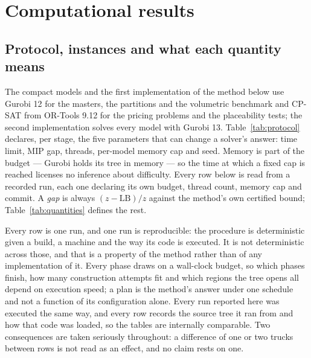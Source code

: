 \section{Computational results}
\label{sec:results}

\subsection{Protocol, instances and what each quantity means}
\label{sec:res-setup}

The compact models and the first implementation of the method below
use Gurobi 12 for the masters, the partitions and the volumetric
benchmark and CP-SAT from OR-Tools 9.12 for the pricing problems and
the placeability tests; the second implementation solves every model
with Gurobi 13.
Table~\ref{tab:protocol} declares, per stage, the five parameters that
can change a solver's answer: time limit, MIP gap, threads, per-model
memory cap and seed. Memory is part of the budget --- Gurobi holds its
tree in memory --- so the time at which a fixed cap is reached licenses
no inference about difficulty. Every row below is read from a recorded run, each one declaring its
own budget, thread count, memory cap and commit. A \emph{gap} is
always $(z-\mathrm{LB})/z$ against the method's own certified bound;
Table~\ref{tab:quantities} defines the rest.

Every row is one run, and one run is reproducible: the procedure is
deterministic given a build, a machine and the way its code is
executed. It is not deterministic across those, and that is a property
of the method rather than of any implementation of it. Every phase
draws on a wall-clock budget, so which phases finish, how many
construction attempts fit and which regions the tree opens all depend
on execution speed; a plan is the method's answer under one schedule
and not a function of its configuration alone. Every run reported here
was executed the same way, and every row records the source tree it ran
from and how that code was loaded, so the tables are internally
comparable. Two consequences are taken seriously throughout: a
difference of one or two trucks between rows is not read as an effect,
and no claim rests on one.

